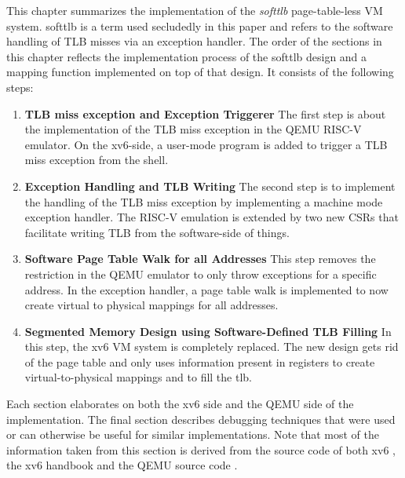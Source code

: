 This chapter summarizes the implementation of the \textit{softtlb} page-table-less VM system. softtlb is a term used secludedly in this paper and refers to the software handling of TLB misses via an exception handler.
The order of the sections in this chapter reflects the implementation process of the softtlb design and a mapping function implemented on top of that design. It consists of the following steps:
\begin{enumerate}
    \item \textbf{TLB miss exception and Exception Triggerer} The first step is about
          the implementation of the TLB miss exception in the QEMU RISC-V emulator. On the xv6-side,
          a user-mode program is added to trigger a TLB miss exception from the shell.
    \item \textbf{Exception Handling and TLB Writing} The second step is to implement the
          handling of the TLB miss exception by implementing a machine mode exception handler.
          The RISC-V emulation is extended by two new CSRs that facilitate writing TLB from the
          software-side of things.
    \item \textbf{Software Page Table Walk for all Addresses} This step removes the restriction
          in the QEMU emulator to only throw exceptions for a specific address. In the exception handler,
          a page table walk is implemented to now create virtual to physical mappings for all addresses.
    \item \textbf{Segmented Memory Design using Software-Defined TLB Filling} In this step, the xv6 VM system is completely
          replaced. The new design gets rid of the page table and only uses information present in
          registers to create virtual-to-physical mappings and to fill the tlb.
\end{enumerate}
Each section elaborates on both the xv6 side and the QEMU side of the implementation.
The final section describes debugging techniques that were used or can otherwise be useful for
similar implementations. Note that most of the information taken from this section is derived from the source code of both xv6 \cite{xv6source}, the xv6 handbook \cite{cox2011xv6} and the QEMU source code \cite{QEMUSource2024}.

